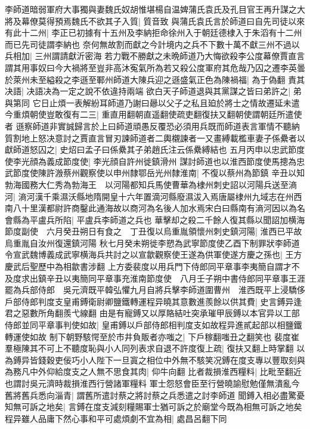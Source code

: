 李師道暗弱軍府大事獨與妻魏氏奴胡惟堪楊自温婢蒲氏袁氏及孔目官王再升謀之大將及幕僚莫得預焉魏氏不欲其子入質|{
	質音致}
與蒲氏袁氏言於師道曰自先司徒以來有此十二州|{
	李正已初據有十五州及李納拒命徐州入于朝廷德棣入于朱滔有十二州而已先司徒謂李納也}
奈何無故割而獻之今計境内之兵不下數十萬不獻三州不過以兵相加|{
	三州謂請獻沂密海}
若力戰不勝獻之未晩師道乃大悔欲殺李公度幕僚賈直言謂其用事奴曰今大禍將至豈非高沐寃氣所為若又殺公度軍府其危哉乃囚之遷李英曇於萊州未至縊殺之李遜至鄆州師道大陳兵迎之遜盛氣正色為陳禍福|{
	為于偽翻}
責其决語|{
	决語决為一定之說不依違持兩端}
欲白天子師道退與其黨謀之皆曰弟許之|{
	弟與第同}
它日止煩一表解紛耳師道乃謝曰曏以父子之私且廹於將士之情故遷延未遣今重煩朝使豈敢復有二三|{
	重直用翻朝直遥翻使疏吏翻復扶又翻朝使謂朝廷所遣使者}
遜察師道非實誠歸言於上曰師道頑愚反覆恐必須用兵既而師道表言軍情不聽納質割地上怒决意討之賈直言冒刃諫師道者二輿櫬諫者一又畫縛載檻車妻子係纍者以獻師道怒囚之|{
	史炤曰孟子曰係纍其子弟趙氏注云係纍縛結也}
五月丙申以忠武節度使李光顔為義成節度使|{
	李光顔自許州徙鎮滑州}
謀討師道也以淮西節度使馬摠為忠武節度使陳許溵蔡州觀察使以申州隸鄂岳光州隸淮南|{
	不復以蔡州為節鎮}
辛丑以知勃海國務大仁秀為勃海王　以河陽都知兵馬使曹華為棣州刺史詔以河陽兵送至滳河|{
	滳河漢千乘濕沃縣地隋開皇十六年置滴河縣廢濕沷入焉唐屬棣州九域志在州西南八十里漢都尉許商鑿此通海故以商河為名後人加水焉宋白曰縣南有滳河因以為名}
會縣為平盧兵所陷|{
	平盧兵李師道之兵也}
華擊却之殺二千餘人復其縣以聞詔加横海節度副使　六月癸丑朔日有食之　丁丑復以烏重胤領懷州刺史鎮河陽|{
	淮西已平故烏重胤自汝州復還鎮河陽}
秋七月癸未朔徙李愬為武寧節度使乙酉下制罪狀李師道令宣武魏博義成武寧横海兵共討之以宣歙觀察使王遂為供軍使遂方慶之孫也|{
	王方慶武后聖歷中為相歙書涉翻}
上方委裴度以用兵門下侍郎同平章事李夷簡自謂才不及度求出鎮辛丑以夷簡同平章事充淮南節度使　八月壬子朔中書侍郎同平章事王涯罷為兵部侍郎　吳元濟既平韓弘懼九月自將兵擊李師道圍曹州　淮西既平上浸驕侈戶部侍郎判度支皇甫鎛衛尉卿鹽鐵轉運程异曉其意數進羨餘以供其費|{
	史言鎛异逢君之惡數所角翻羨弋線翻}
由是有寵鎛又以厚賂結吐突承璀甲辰鎛以本官异以工部侍郎並同平章事判使如故|{
	皇甫鎛以戶部侍郎相判度支如故程异進貳起部以相鹽鐵轉運使如故}
制下朝野駭愕至於市井負販者亦嗤之|{
	下戶稼翻嗤丑之翻笑也}
裴度崔羣極陳其不可上不聽度恥與小人同列表求自退不許度復上疏|{
	復扶又翻上時掌翻}
以為鎛异皆錢穀吏佞巧小人陛下一旦寘之相位中外無不駭笑况鎛在度支專以豐取刻與為務凡中外仰給度支之人無不思食其肉|{
	仰牛向翻}
比者裁損淮西糧料|{
	比毗至翻近也謂討吳元濟時裁損淮西行營諸軍糧料}
軍士怨怒會臣至行營曉諭慰勉僅無潰亂今舊將舊兵悉向淄青|{
	謂舊所遣討蔡之將討蔡之兵悉遣之討李師道}
聞鎛入相必盡驚憂知無可訴之地矣|{
	言鎛在度支減刻糧賜軍士猶可訴之於廟堂今既為相無可訴之地矣}
程异雖人品庸下然心事和平可處煩劇不宜為相|{
	處昌呂翻下同}
